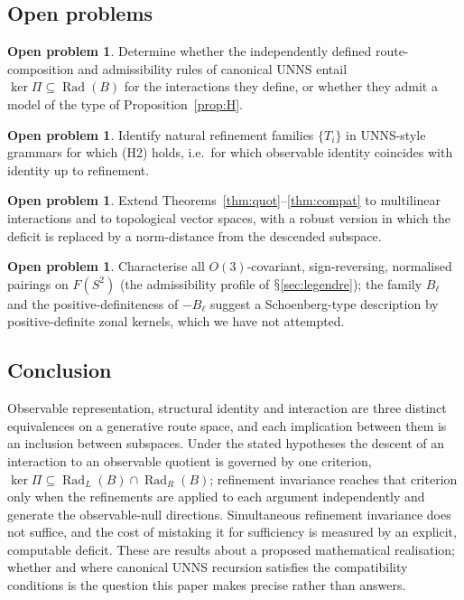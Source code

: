 \documentclass[11pt,a4paper]{article}
\renewcommand{\S}{\ensuremath{\mathsection}}
\newcommand{\Rad}{\operatorname{Rad}}
\theoremstyle{plain}
\theoremstyle{definition}
\newtheorem{problem}[theorem]{Open problem}
\begin{document}
\subsection{Open problems}
\begin{problem}\label{prob:entail}
Determine whether the independently defined route-composition and admissibility rules of canonical UNNS entail $\ker\Pi\subseteq\Rad(B)$ for the interactions they define, or whether they admit a model of the type of Proposition~\ref{prop:H}.
\end{problem}
\begin{problem}
Identify natural refinement families $\{T_i\}$ in UNNS-style grammars for which (H2) holds, i.e.\ for which observable identity coincides with identity up to refinement.
\end{problem}
\begin{problem}
Extend Theorems~\ref{thm:quot}--\ref{thm:compat} to multilinear interactions and to topological vector spaces, with a robust version in which the deficit is replaced by a norm-distance from the descended subspace.
\end{problem}
\begin{problem}
Characterise all $O(3)$-covariant, sign-reversing, normalised pairings on $F(S^2)$ (the admissibility profile of \S\ref{sec:legendre}); the family $B_\ell$ and the positive-definiteness of $-B_\ell$ suggest a Schoenberg-type description by positive-definite zonal kernels, which we have not attempted.
\end{problem}

\subsection{Conclusion}
Observable representation, structural identity and interaction are three distinct equivalences on a generative route space, and each implication between them is an inclusion between subspaces. Under the stated hypotheses the descent of an interaction to an observable quotient is governed by one criterion, $\ker\Pi\subseteq\Rad_L(B)\cap\Rad_R(B)$; refinement invariance reaches that criterion only when the refinements are applied to each argument independently and generate the observable-null directions. Simultaneous refinement invariance does not suffice, and the cost of mistaking it for sufficiency is measured by an explicit, computable deficit. These are results about a proposed mathematical realisation; whether and where canonical UNNS recursion satisfies the compatibility conditions is the question this paper makes precise rather than answers.
\end{document}
